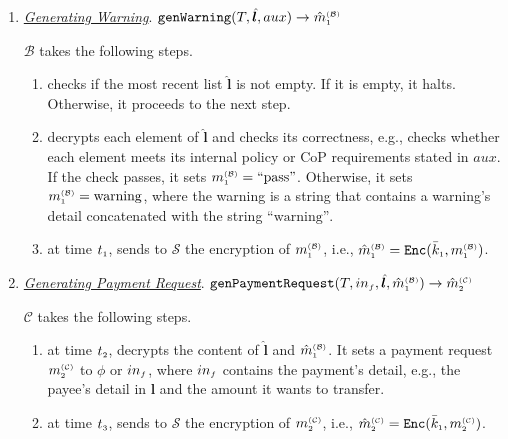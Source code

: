 \begin{enumerate}
 



\item\label{Generating-Warning} \underline{\textit{Generating Warning}}. $\mathtt{genWarning}(T, {\hat{\bm l}}, aux)\rightarrow \hat m^{\scriptscriptstyle\mathcal{(B)}}_{\scriptscriptstyle1}$
%

$\mathcal{B}$ takes the following steps. 
\begin{enumerate}
%
\item  checks if the most recent list $\hat{\bm{l}}$ is not empty. If it is empty, it halts. Otherwise, it proceeds to the next step. 
%
\item  decrypts each element of $\hat{\bm l}$ and checks its correctness, e.g., checks whether each element meets its internal policy or CoP requirements stated in $aux$. If the check passes, it sets $m_{\scriptscriptstyle 1}^{\scriptscriptstyle(\mathcal{B})}= \text{``pass''}$. Otherwise, it sets $m_{\scriptscriptstyle 1}^{\scriptscriptstyle(\mathcal{B})}=\text{warning}$, where the warning is a  string that contains a warning's detail concatenated with the string $\text{``warning''}$.
%
\item at time $t_{\scriptscriptstyle 1}$, sends to $\mathcal{S}$ the encryption of $m_{\scriptscriptstyle 1}^{\scriptscriptstyle(\mathcal{B})}$, i.e.,  $\hat m_{\scriptscriptstyle 1}^{\scriptscriptstyle(\mathcal{B})}= \mathtt{Enc}(\bar k_{\scriptscriptstyle 1}, m_{\scriptscriptstyle 1}^{\scriptscriptstyle(\mathcal B)})$. 
\end{enumerate}



\item\label{clinet-at-T2} \underline{\textit{Generating Payment Request}}. $\mathtt{genPaymentRequest}(T, in_{\scriptscriptstyle f}, \hat{\bm{l}}, \hat m^{\scriptscriptstyle\mathcal{(B)}}_{\scriptscriptstyle1})\rightarrow \hat m^{\scriptscriptstyle\mathcal{(C)}}_{\scriptscriptstyle2}$

$\mathcal{C}$ takes the following steps. 
\begin{enumerate}
%
\item\label{decrypt-warning} at time $t_{\scriptscriptstyle 2}$, decrypts the content of $\hat{\bm{l}}$ and $\hat m_{\scriptscriptstyle 1}^{\scriptscriptstyle(\mathcal{B})}$.  It sets a payment request $m_{\scriptscriptstyle 2}^{\scriptscriptstyle(\mathcal C)}$ to  $\phi$ or  $in_{\scriptscriptstyle f}$, where $in_{\scriptscriptstyle f}$ contains the payment's detail, e.g., the payee's detail in $\bm l$ and the amount it wants to transfer. 
%
\item\label{send-payment-req} at time $t_{\scriptscriptstyle 3}$, sends  to $\mathcal{S}$ the encryption of $m_{\scriptscriptstyle 2}^{\scriptscriptstyle(\mathcal C)}$, i.e., $\hat m_{\scriptscriptstyle 2}^{\scriptscriptstyle(\mathcal{C})}= \mathtt{Enc}(\bar k_{\scriptscriptstyle 1}, m_{\scriptscriptstyle 2}^{\scriptscriptstyle(\mathcal C)})$.
\end{enumerate}
%


\end{enumerate}
